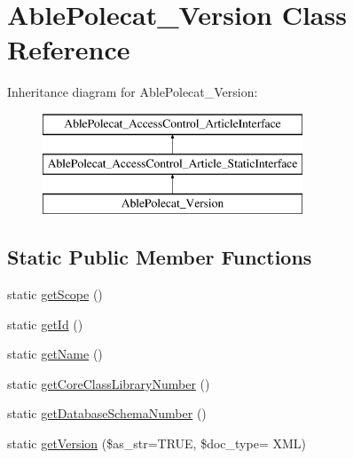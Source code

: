 \hypertarget{class_able_polecat___version}{}\section{Able\+Polecat\+\_\+\+Version Class Reference}
\label{class_able_polecat___version}
Inheritance diagram for Able\+Polecat\+\_\+\+Version\+:\begin{figure}[H]
\begin{center}
\leavevmode
\includegraphics[height=3.000000cm]{class_able_polecat___version}
\end{center}
\end{figure}
\subsection*{Static Public Member Functions}
\begin{DoxyCompactItemize}
\item 
static \hyperlink{class_able_polecat___version_ad9ade868bd136d32967059d1cccb3e92}{get\+Scope} ()
\item 
static \hyperlink{class_able_polecat___version_acfaa3a96d0cb5a4c0d4d710dcba41e9e}{get\+Id} ()
\item 
static \hyperlink{class_able_polecat___version_a4ef9bd37ba3ce8a13c1e8bcf4f72a630}{get\+Name} ()
\item 
static \hyperlink{class_able_polecat___version_a38f8bab1ad9134e78b417f86bd5ee491}{get\+Core\+Class\+Library\+Number} ()
\item 
static \hyperlink{class_able_polecat___version_ac8eabc530840cd1ef839e89dbfc041fe}{get\+Database\+Schema\+Number} ()
\item 
static \hyperlink{class_able_polecat___version_a2613fcbd144934a04c07e8591e1b3b38}{get\+Version} (\$as\+\_\+str=T\+R\+U\+E, \$doc\+\_\+type= \textquotesingle{}X\+M\+L\textquotesingle{})
\end{DoxyCompactItemize}
